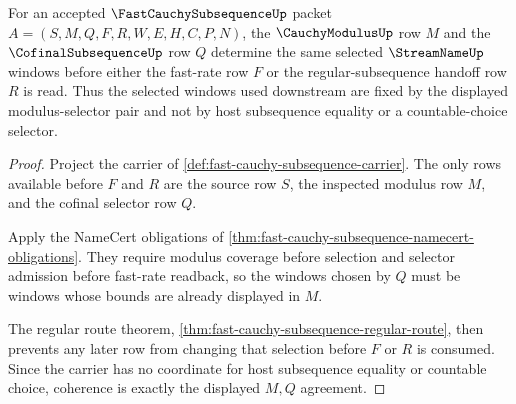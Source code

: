 \begin{theorem}
\label{thm:fast-cauchy-subsequence-modulus-selector-coherence}
For an accepted $\FastCauchySubsequenceUp$ packet $A=(S,M,Q,F,R,W,E,H,C,P,N)$, the $\CauchyModulusUp$ row $M$ and the $\CofinalSubsequenceUp$ row $Q$ determine the same selected $\StreamNameUp$ windows before either the fast-rate row $F$ or the regular-subsequence handoff row $R$ is read. Thus the selected windows used downstream are fixed by the displayed modulus-selector pair and not by host subsequence equality or a countable-choice selector.
\end{theorem}
\begin{proof}
Project the carrier of \autoref{def:fast-cauchy-subsequence-carrier}. The only rows available before $F$ and $R$ are the source row $S$, the inspected modulus row $M$, and the cofinal selector row $Q$.

Apply the NameCert obligations of \autoref{thm:fast-cauchy-subsequence-namecert-obligations}. They require modulus coverage before selection and selector admission before fast-rate readback, so the windows chosen by $Q$ must be windows whose bounds are already displayed in $M$.

The regular route theorem, \autoref{thm:fast-cauchy-subsequence-regular-route}, then prevents any later row from changing that selection before $F$ or $R$ is consumed. Since the carrier has no coordinate for host subsequence equality or countable choice, coherence is exactly the displayed $M,Q$ agreement.
\end{proof}

